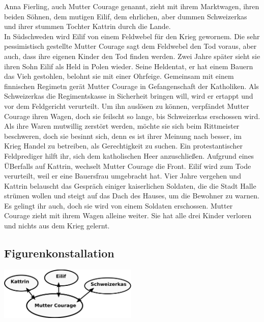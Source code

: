 \documentclass[a4paper]{article}
\begin{document}
	Anna Fierling, auch Mutter Courage genannt, zieht mit ihrem Marktwagen, ihren beiden Söhnen, dem mutigen Eilif, dem ehrlichen, aber dummen Schweizerkas und ihrer stummen Tochter Kattrin durch die Lande.\\
        In Südschweden wird Eilif von einem Feldwebel für den Krieg gewornem. Die sehr pessimistisch gestellte Mutter Courage sagt dem Feldwebel den Tod voraus, aber auch, dass ihre eigenen Kinder den Tod finden werden. Zwei Jahre später sieht sie ihren Sohn Eilif als Held in Polen wieder. Seine Heldentat, er hat einem Bauern das Vieh gestohlen, belohnt sie mit einer Ohrfeige. Gemeinsam mit einem finnischen Regimetn gerät Mutter Courage in Gefangenschaft der Katholiken. Als Schweizerkas die Regimentskasse in Sicherheit bringen will, wird er ertappt und vor dem Feldgericht verurteilt. Um ihn auslösen zu können, verpfändet Mutter Courage ihren Wagen, doch sie feilscht so lange, bis Schweizerkas erschossen wird. Als ihre Waren mutwillig zerstört werden, möchte sie sich beim Rittmeister beschweren, doch sie besinnt sich, denn es ist ihrer Meinung nach besser, im Krieg Handel zu betreiben, als Gerechtigkeit zu suchen. Ein protestantischer Feldprediger hilft ihr, sich dem katholischen Heer anzuschließen. Aufgrund eines ÜBerfalls auf Kattrin, wechselt Mutter Courage die Front. Eilif wird zum Tode verurteilt, weil er eine Bauersfrau umgebracht hat. Vier Jahre vergehen und Kattrin belauscht das Gespräch einiger kaiserlichen Soldaten, die die Stadt Halle strümen wollen und steigt auf das Dach des Hauses, um die Bewohner zu warnen. Es gelingt ihr auch, doch sie wird von einem Soldaten erschossen. Mutter Courage zieht mit ihrem Wagen alleine weiter. Sie hat alle drei Kinder verloren und nichts aus dem Krieg gelernt.
        
        \subsection{Figurenkonstallation}
	\includegraphics[width=250px]{img/figuren.png}
        
\end{document}
